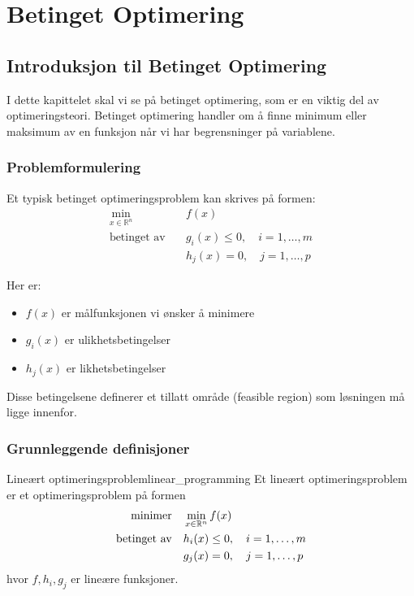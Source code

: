 \part{Betinget Optimering}

\chapter{Introduksjon til Betinget Optimering}

I dette kapittelet skal vi se på betinget optimering, som er en viktig del av optimeringsteori. Betinget optimering handler om å finne minimum eller maksimum av en funksjon når vi har begrensninger på variablene.

\section{Problemformulering}

Et typisk betinget optimeringsproblem kan skrives på formen:
\begin{align*}
  \min_{x \in \mathbb{R}^n} \quad & f(x) \\
  \text{betinget av} \quad & g_i(x) \leq 0, \quad i = 1,\ldots,m \\
  & h_j(x) = 0, \quad j = 1,\ldots,p
\end{align*}

Her er:
\begin{itemize}
  \item $f(x)$ er målfunksjonen vi ønsker å minimere
  \item $g_i(x)$ er ulikhetsbetingelser
  \item $h_j(x)$ er likhetsbetingelser
\end{itemize}

Disse betingelsene definerer et tillatt område (feasible region) som løsningen må ligge innenfor. 

\section{Grunnleggende definisjoner}

\begin{definition}{Lineært optimeringsproblem}{linear_programming}
  Et lineært optimeringsproblem er et optimeringsproblem på formen
  \begin{align*}
    \text{minimer}     & \quad \min_{x \in \mathbb{R}^n} f(x)                \\
    \text{betinget av} & \quad h_i(x) \leq 0, \quad i = 1, \ldots, m \\
                       & \quad g_j(x) = 0, \quad j = 1, \ldots, p
  \end{align*}
  hvor \(f, h_i, g_j\) er lineære funksjoner.
\end{definition}

